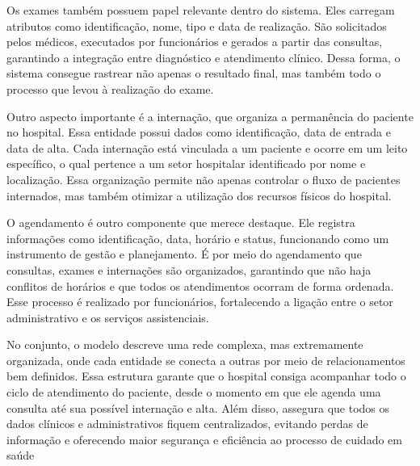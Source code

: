 \documentclass[a4paper,12pt]{article}
\begin{document}
Os exames também possuem papel relevante dentro do sistema. Eles carregam atributos como identificação, nome, tipo e data de realização. São solicitados pelos médicos, executados por funcionários e gerados a partir das consultas, garantindo a integração entre diagnóstico e atendimento clínico. Dessa forma, o sistema consegue rastrear não apenas o resultado final, mas também todo o processo que levou à realização do exame.

Outro aspecto importante é a internação, que organiza a permanência do paciente no hospital. Essa entidade possui dados como identificação, data de entrada e data de alta. Cada internação está vinculada a um paciente e ocorre em um leito específico, o qual pertence a um setor hospitalar identificado por nome e localização. Essa organização permite não apenas controlar o fluxo de pacientes internados, mas também otimizar a utilização dos recursos físicos do hospital.

O agendamento é outro componente que merece destaque. Ele registra informações como identificação, data, horário e status, funcionando como um instrumento de gestão e planejamento. É por meio do agendamento que consultas, exames e internações são organizados, garantindo que não haja conflitos de horários e que todos os atendimentos ocorram de forma ordenada. Esse processo é realizado por funcionários, fortalecendo a ligação entre o setor administrativo e os serviços assistenciais.

No conjunto, o modelo descreve uma rede complexa, mas extremamente organizada, onde cada entidade se conecta a outras por meio de relacionamentos bem definidos. Essa estrutura garante que o hospital consiga acompanhar todo o ciclo de atendimento do paciente, desde o momento em que ele agenda uma consulta até sua possível internação e alta. Além disso, assegura que todos os dados clínicos e administrativos fiquem centralizados, evitando perdas de informação e oferecendo maior segurança e eficiência ao processo de cuidado em saúde
\end{document}

